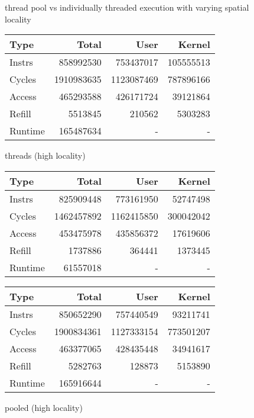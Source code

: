 \documentclass[11pt]{article}
\begin{document}
\begin{figure*}[!h]
	\caption{thread pool vs individually threaded execution with varying spatial locality}
	\label{fig:pooling}
	\centering
	\begin{subtable}{.48\textwidth}
		\centering
		\begin{tabular}{ l|rrr }
			Type    & Total      & User       & Kernel    \\
			\hline
			Instrs & 858992530 & 753437017 & 105555513 \\ 
			Cycles & 1910983635 & 1123087469 & 787896166 \\ 
			Access & 465293588 & 426171724 & 39121864 \\ 
			Refill & 5513845 & 210562 & 5303283 \\ 
			Runtime & 165487634 & - & - \\ 
			\hline
		\end{tabular}
		\caption{threads (high locality)}
	\end{subtable}
	\hfill
	\begin{subtable}{.48\textwidth} 
		\centering
		\begin{tabular}{ l|rrr }
			Type    & Total      & User       & Kernel    \\
			\hline
			Instrs & 825909448 & 773161950 & 52747498 \\ 
			Cycles & 1462457892 & 1162415850 & 300042042 \\ 
			Access & 453475978 & 435856372 & 17619606 \\ 
			Refill & 1737886 & 364441 & 1373445 \\ 
			Runtime & 61557018 & - & - \\
			\hline
		\end{tabular}
		\caption{pooled (high locality)}        
	\end{subtable}
	\begin{subtable}{.48\textwidth} 
		\centering
		\begin{tabular}{ l|rrr }
			Type    & Total      & User       & Kernel    \\
			\hline
			Instrs & 850652290 & 757440549 & 93211741 \\ 
			Cycles & 1900834361 & 1127333154 & 773501207 \\ 
			Access & 463377065 & 428435448 & 34941617 \\ 
			Refill & 5282763 & 128873 & 5153890 \\ 
			Runtime & 165916644 & - & - \\
			\hline
		\end{tabular}

\end{subtable}
\end{figure*}
\end{document}
